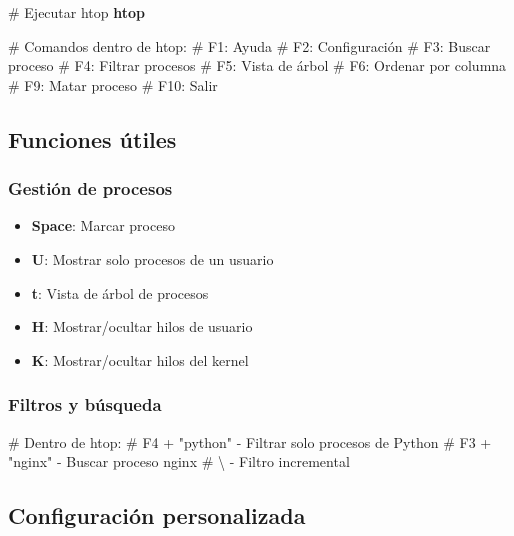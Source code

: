 \documentclass[
  11pt,
  letterpaper,
  oneside,
  openany]{scrbook}
\newenvironment{Shaded}{}{}
\newcommand{\CommentTok}[1]{\textcolor[rgb]{0.42,0.45,0.49}{#1}}
\newcommand{\ExtensionTok}[1]{\textcolor[rgb]{0.84,0.23,0.29}{\textbf{#1}}}
\providecommand{\tightlist}{%
  \setlength{\itemsep}{0pt}\setlength{\parskip}{0pt}}
\begin{document}
\begin{Shaded}
\begin{Highlighting}[]
\CommentTok{\# Ejecutar htop}
\ExtensionTok{htop}

\CommentTok{\# Comandos dentro de htop:}
\CommentTok{\# F1: Ayuda}
\CommentTok{\# F2: Configuración}
\CommentTok{\# F3: Buscar proceso}
\CommentTok{\# F4: Filtrar procesos}
\CommentTok{\# F5: Vista de árbol}
\CommentTok{\# F6: Ordenar por columna}
\CommentTok{\# F9: Matar proceso}
\CommentTok{\# F10: Salir}
\end{Highlighting}
\end{Shaded}

\subsection{Funciones útiles}\label{funciones-uxfatiles}

\subsubsection{Gestión de procesos}\label{gestiuxf3n-de-procesos-1}

\begin{itemize}
\tightlist
\item
  \textbf{Space}: Marcar proceso
\item
  \textbf{U}: Mostrar solo procesos de un usuario
\item
  \textbf{t}: Vista de árbol de procesos
\item
  \textbf{H}: Mostrar/ocultar hilos de usuario
\item
  \textbf{K}: Mostrar/ocultar hilos del kernel
\end{itemize}

\subsubsection{Filtros y búsqueda}\label{filtros-y-buxfasqueda}

\begin{Shaded}
\begin{Highlighting}[]
\CommentTok{\# Dentro de htop:}
\CommentTok{\# F4 + "python" {-} Filtrar solo procesos de Python}
\CommentTok{\# F3 + "nginx" {-} Buscar proceso nginx}
\CommentTok{\# \textbackslash{} {-} Filtro incremental}
\end{Highlighting}
\end{Shaded}

\subsection{Configuración
personalizada}\label{configuraciuxf3n-personalizada-1}
\end{document}
